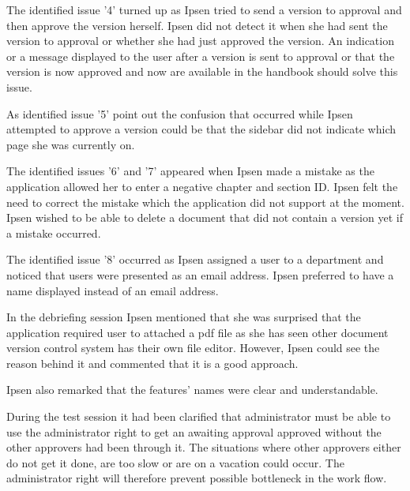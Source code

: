 The identified issue '4' turned up as Ipsen tried to send a version to approval and then  approve the version herself.
Ipsen did not detect it when she had sent the version to approval or whether she had just approved the version.
An indication or a message displayed to the user after a version is sent to approval or that the version is now approved and now are available in the handbook should solve this issue. %

As identified issue '5' point out the confusion that occurred while Ipsen attempted to approve a version could be that the sidebar did not indicate which page she was currently on.

The identified issues '6' and '7' appeared when Ipsen made a mistake as the application allowed her to enter a negative chapter and section ID.
Ipsen felt the need to correct the mistake which the application did not support at the moment.
Ipsen wished to be able to delete a document that did not contain a version yet if a mistake occurred.

The identified issue '8' occurred as Ipsen assigned a user to a department and noticed that users were presented as an email address.
Ipsen preferred to have a name displayed instead of an email address.

In the debriefing session Ipsen mentioned that she was surprised that the application required user to attached a pdf file as she has seen other document version control system has their own file editor.
However, Ipsen could see the reason behind it and commented that it is a good approach.

Ipsen also remarked that the features' names were clear and understandable.

During the test session it had been clarified that administrator must be able to use the administrator right to get an awaiting approval approved without the other approvers had been through it.
The situations where other approvers either do not get it done, are too slow or are on a vacation could occur.
The administrator right will therefore prevent possible bottleneck in the work flow.

